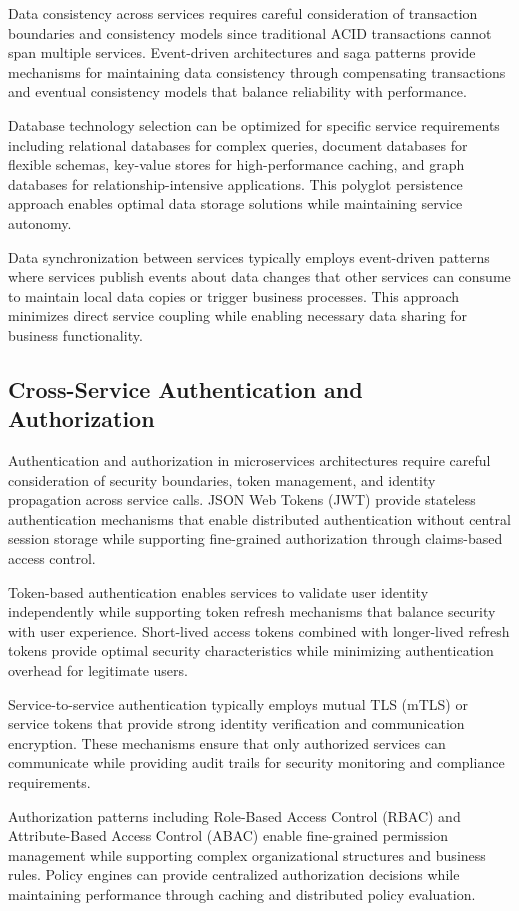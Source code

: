Data consistency across services requires careful consideration of transaction boundaries and consistency models since traditional ACID transactions cannot span multiple services. Event-driven architectures and saga patterns provide mechanisms for maintaining data consistency through compensating transactions and eventual consistency models that balance reliability with performance.

Database technology selection can be optimized for specific service requirements including relational databases for complex queries, document databases for flexible schemas, key-value stores for high-performance caching, and graph databases for relationship-intensive applications. This polyglot persistence approach enables optimal data storage solutions while maintaining service autonomy.

Data synchronization between services typically employs event-driven patterns where services publish events about data changes that other services can consume to maintain local data copies or trigger business processes. This approach minimizes direct service coupling while enabling necessary data sharing for business functionality.

\subsection{Cross-Service Authentication and Authorization}

Authentication and authorization in microservices architectures require careful consideration of security boundaries, token management, and identity propagation across service calls. JSON Web Tokens (JWT) provide stateless authentication mechanisms that enable distributed authentication without central session storage while supporting fine-grained authorization through claims-based access control.

Token-based authentication enables services to validate user identity independently while supporting token refresh mechanisms that balance security with user experience. Short-lived access tokens combined with longer-lived refresh tokens provide optimal security characteristics while minimizing authentication overhead for legitimate users.

Service-to-service authentication typically employs mutual TLS (mTLS) or service tokens that provide strong identity verification and communication encryption. These mechanisms ensure that only authorized services can communicate while providing audit trails for security monitoring and compliance requirements.

Authorization patterns including Role-Based Access Control (RBAC) and Attribute-Based Access Control (ABAC) enable fine-grained permission management while supporting complex organizational structures and business rules. Policy engines can provide centralized authorization decisions while maintaining performance through caching and distributed policy evaluation.

